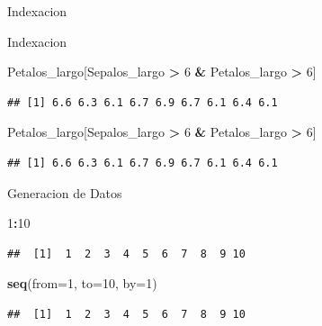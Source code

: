 \documentclass[
  ignorenonframetext,
]{beamer}
\newenvironment{Shaded}{\begin{snugshade}}{\end{snugshade}}
\newcommand{\AttributeTok}[1]{\textcolor[rgb]{0.13,0.29,0.53}{#1}}
\newcommand{\DecValTok}[1]{\textcolor[rgb]{0.00,0.00,0.81}{#1}}
\newcommand{\FunctionTok}[1]{\textcolor[rgb]{0.13,0.29,0.53}{\textbf{#1}}}
\newcommand{\NormalTok}[1]{#1}
\newcommand{\SpecialCharTok}[1]{\textcolor[rgb]{0.81,0.36,0.00}{\textbf{#1}}}
\begin{document}
\begin{frame}[fragile]{Indexacion}
\begin{block}{Indexacion}
\begin{Shaded}
\begin{Highlighting}[]
\NormalTok{Petalos\_largo[Sepalos\_largo }\SpecialCharTok{\textgreater{}} \DecValTok{6} \SpecialCharTok{\&}\NormalTok{ Petalos\_largo }\SpecialCharTok{\textgreater{}} \DecValTok{6}\NormalTok{]}
\end{Highlighting}
\end{Shaded}

\begin{verbatim}
## [1] 6.6 6.3 6.1 6.7 6.9 6.7 6.1 6.4 6.1
\end{verbatim}

\begin{Shaded}
\begin{Highlighting}[]
\NormalTok{Petalos\_largo[Sepalos\_largo }\SpecialCharTok{\textgreater{}} \DecValTok{6} \SpecialCharTok{\&}\NormalTok{ Petalos\_largo }\SpecialCharTok{\textgreater{}} \DecValTok{6}\NormalTok{]}
\end{Highlighting}
\end{Shaded}

\begin{verbatim}
## [1] 6.6 6.3 6.1 6.7 6.9 6.7 6.1 6.4 6.1
\end{verbatim}
\end{block}

\begin{block}{Generacion de Datos}
\protect\hypertarget{generacion-de-datos}{}
\begin{Shaded}
\begin{Highlighting}[]
\DecValTok{1}\SpecialCharTok{:}\DecValTok{10}
\end{Highlighting}
\end{Shaded}

\begin{verbatim}
##  [1]  1  2  3  4  5  6  7  8  9 10
\end{verbatim}

\begin{Shaded}
\begin{Highlighting}[]
\FunctionTok{seq}\NormalTok{(}\AttributeTok{from=}\DecValTok{1}\NormalTok{, }\AttributeTok{to=}\DecValTok{10}\NormalTok{, }\AttributeTok{by=}\DecValTok{1}\NormalTok{)}
\end{Highlighting}
\end{Shaded}

\begin{verbatim}
##  [1]  1  2  3  4  5  6  7  8  9 10
\end{verbatim}


\end{block}
\end{frame}
\end{document}
